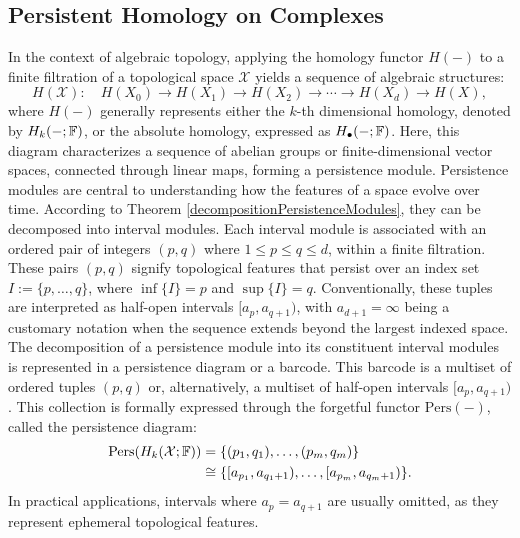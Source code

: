 \subsection{Persistent Homology on Complexes}
\label{PersistentHomologyonComplexes}
In the context of algebraic topology, applying the homology functor $H(-)$
to a finite filtration of a topological space $\mathcal{X}$ yields a sequence of algebraic structures:
\begin{equation}
	H(\mathcal{X}): \quad H(X_0) \rightarrow H(X_{1}) \to H(X_{2}) \to \cdots
	\to H(X_{d}) \rightarrow H(X),
\end{equation}
where $H(-)$ generally represents either the $k$-th dimensional
homology, denoted by $H_{k}(-;{\mathbb{F}})$, or the absolute homology, expressed as $H
_{\bullet}(-;{\mathbb{F}})$. Here, this diagram characterizes a sequence of abelian
groups or finite-dimensional vector spaces, connected through linear maps, forming a persistence module. Persistence modules are central to understanding how the features of a space evolve
over time. According to Theorem \ref{decompositionPersistenceModules}, they can be decomposed into interval modules. Each interval module is associated with an
ordered pair of integers $(p,q)$ where $1 \leq p \leq q \leq d$, within a finite
filtration. These pairs $(p,q)$ signify topological features that persist over an
index set $I := \{p, \ldots, q\}$, where $\inf\{I\} = p$ and $\sup\{I\} = q$. Conventionally,
these tuples are interpreted as half-open intervals $[a_{p}, a_{q+1})$, with $a_{d+1}
= \infty$ being a customary notation when the sequence extends beyond the largest
indexed space. The decomposition of a persistence module into its constituent interval modules is
represented in a persistence diagram or a barcode. This barcode is a multiset of ordered tuples $(p,q)$ or, alternatively, a multiset
of half-open intervals $[a_{p}, a_{q+1})$. This collection is formally expressed
through the forgetful functor $\mathrm{Pers}(-)$, called the persistence diagram:
\begin{align}
    \mathrm{Pers}(H_k(\mathcal{X};{\mathbb{F}})) & = \{(p_{1},q_{1}), \ldots, (p_{m},q_{m})\}                    \\
                                           & \cong \{[a_{p_1}, a_{q_1+1}), \ldots, [a_{p_m}, a_{q_m+1})\}.
\end{align}
In practical applications, intervals where $a_{p} = a_{q+1}$ are usually omitted,
as they represent ephemeral topological features.

